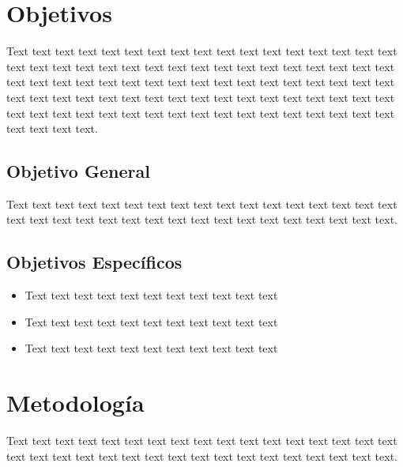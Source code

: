 \documentclass[12pt,a4paper]{article}
\begin{document}
\section{Objetivos}
\label{sec:8}
Text text text text text text text text text text text text text text text text text text text text text text text text text text text text text text text text text text text text text text text text text text text text text text text text text text text text text text text text text text text text text text text text text text text text text text text text text text text text text text text text text text text text text text text text text.
\subsection{Objetivo General}
\label{sec:9}
Text text text text text text text text text text text  text text text text text text text text text text text text text text text text text text text text text text text.

\subsection{Objetivos Específicos}
\label{sec:10}


\begin{itemize}
  \item Text text text text text text text text text text text
  \item Text text text text text text text text text text text
  \item Text text text text text text text text text text text
\end{itemize}


\section{Metodología}\label{sec:11}
Text text text text text text text text text text text  text text text text text text text text text text text text text text text text text text text text text text text.
\end{document}
